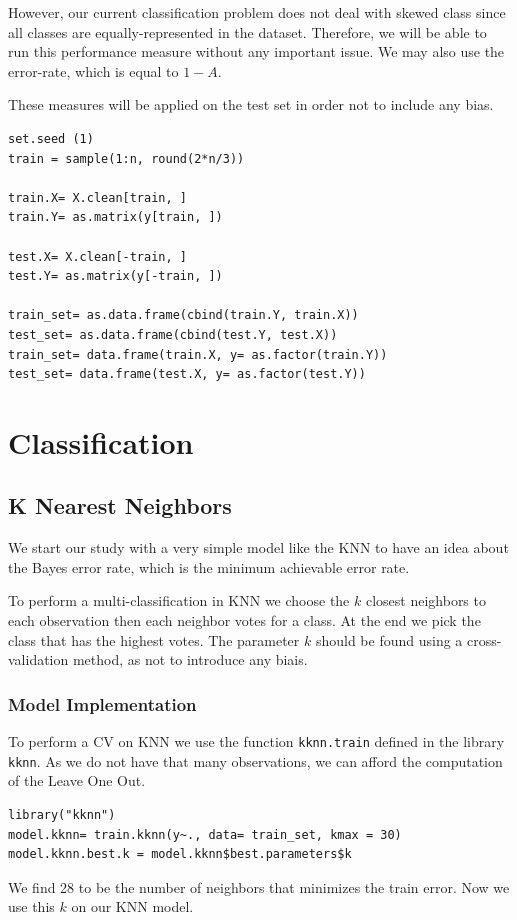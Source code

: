 \documentclass[]{report}
\begin{document}
However, our current classification problem does not deal with skewed class since all classes are equally-represented in the dataset. Therefore, we will be able to run this performance measure without any important issue. We may also use the error-rate, which is equal to $1 - A$.

 These measures will be applied on the test set in order not to include any bias.

\begin{lstlisting}
set.seed (1)
train = sample(1:n, round(2*n/3))

train.X= X.clean[train, ]
train.Y= as.matrix(y[train, ])

test.X= X.clean[-train, ]
test.Y= as.matrix(y[-train, ])

train_set= as.data.frame(cbind(train.Y, train.X))
test_set= as.data.frame(cbind(test.Y, test.X))
train_set= data.frame(train.X, y= as.factor(train.Y))
test_set= data.frame(test.X, y= as.factor(test.Y))
\end{lstlisting}

\pagebreak
\section{Classification}

\subsection{K Nearest Neighbors}
We start our study with a very simple model like the KNN to have an idea about the Bayes error rate, which is the minimum achievable error rate. 

To perform a multi-classification in KNN we choose the $k$ closest neighbors to each observation then each neighbor votes for a  class. At the end we pick the class that has the highest votes. The parameter $k$ should be found using a cross-validation method, as not to introduce any biais.

\subsubsection{Model Implementation}
To perform a CV on KNN we use the function \texttt{kknn.train} defined in the library \texttt{kknn}. As we do not have that many observations, we can afford the computation of the Leave One Out.
\begin{lstlisting}
library("kknn")
model.kknn= train.kknn(y~., data= train_set, kmax = 30)
model.kknn.best.k = model.kknn$best.parameters$k
\end{lstlisting}
We find 28 to be the number of neighbors that minimizes the train error. Now we use this $k$ on our KNN model.
\end{document}
